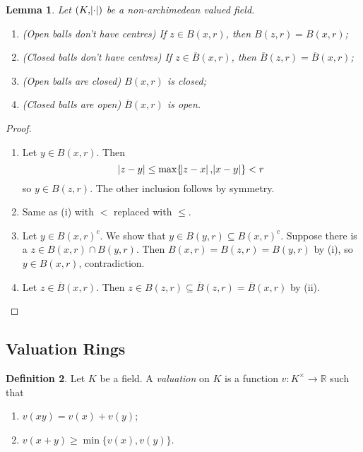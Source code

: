 \documentclass[11pt]{article}
\theoremstyle{definition}
\newtheorem{definition}{Definition}[subsection]
\theoremstyle{plain}
\newtheorem{lemma}[definition]{Lemma}
\theoremstyle{remark}
\newcommand{\RR}{\mathbb{R}}
\begin{document}
\begin{lemma}\label{lem:1_8}
    Let $(K, \abs{\cdot})$ be a non-archimedean valued field.
    \begin{enumerate}
        \item (Open balls don't have centres) If $z \in B(x, r)$, then $B(z, r) = B(x, r)$;
        \item (Closed balls don't have centres) If $z \in \overline{B}(x, r)$, then $\overline{B}(z, r) = \overline{B}(x, r)$;
        \item (Open balls are closed) $B(x, r)$ is closed;
        \item (Closed balls are open) $\overline{B}(x, r)$ is open.
    \end{enumerate}
\end{lemma}
\begin{proof}\phantom{}
    \begin{enumerate}
        \item Let $y \in B(x, r)$. Then
            \begin{equation*}
                \abs{z - y} \le \max\{\abs{z-x}, \abs{x-y}\} < r
            \end{equation*}
            so $y \in B(z, r)$. The other inclusion follows by symmetry.
        \item Same as (i) with $<$ replaced with $\le$.
        \item Let $y \in B(x, r)^c$. We show that $y \in B(y, r) \subseteq B(x, r)^c$. Suppose there is a $z \in B(x, r) \cap B(y, r)$. Then $B(x, r) = B(z, r) = B(y, r)$ by (i), so $y \in B(x, r)$, contradiction.
        \item Let $z \in \overline{B}(x, r)$. Then $z \in B(z, r) \subseteq \overline{B}(z, r) = \overline{B}(x, r)$ by (ii). \qedhere
    \end{enumerate}
\end{proof}

\subsection{Valuation Rings}

\begin{definition}\label{def:2_1}
    Let $K$ be a field. A \emph{valuation} on $K$ is a function $v : K^\times \to \RR$ such that
    \begin{enumerate}
        \item $v(xy) = v(x) + v(y)$;
        \item $v(x + y) \ge \min\{v(x), v(y)\}$.
    \end{enumerate}
\end{definition}
\end{document}
